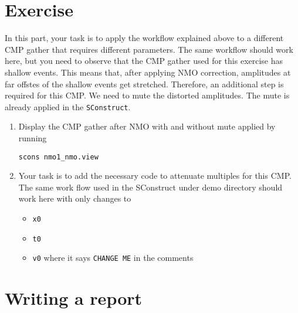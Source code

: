 \lstset{language=python,numbers=left,numberstyle=\tiny,showstringspaces=false}


\section{Exercise}

In this part, your task is to apply the workflow explained above to a different CMP gather that requires different parameters. The same workflow should work here, but you need to observe that the CMP gather used for this exercise has shallow events. This means that, after applying NMO correction, amplitudes at far offstes of the shallow events get stretched. Therefore, an additional step is required for this CMP. We need to mute the distorted amplitudes. The mute is already applied in the \texttt{SConstruct}. 
\begin{enumerate}

\item Display the CMP gather after NMO with and without mute applied by running 
\begin{verbatim}
scons nmo1_nmo.view
\end{verbatim}

\item Your task is to add the necessary code to attenuate multiples for this CMP.
The same work flow used in the SConstruct under demo directory should work here with only changes to 
\begin{itemize}
\item \texttt{x0}
\item \texttt{t0}
\item \texttt{v0}
\newline where it says \texttt{CHANGE ME} in the comments
\end{itemize}

\end{enumerate}

\section{Writing a report}

